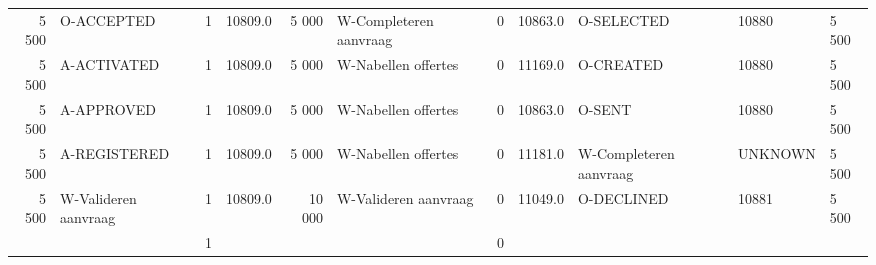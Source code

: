 \begin{tabular}{rlrlrlrllll}
5 500 & O-ACCEPTED & 1 & 10809.0 & 5 000 & W-Completeren aanvraag & 0 & 10863.0 & O-SELECTED & 10880 & 5 500 \\
5 500 & A-ACTIVATED & 1 & 10809.0 & 5 000 & W-Nabellen offertes & 0 & 11169.0 & O-CREATED & 10880 & 5 500 \\
5 500 & A-APPROVED & 1 & 10809.0 & 5 000 & W-Nabellen offertes & 0 & 10863.0 & O-SENT & 10880 & 5 500 \\
5 500 & A-REGISTERED & 1 & 10809.0 & 5 000 & W-Nabellen offertes & 0 & 11181.0 & W-Completeren aanvraag & UNKNOWN & 5 500 \\
5 500 & W-Valideren aanvraag & 1 & 10809.0 & 10 000 & W-Valideren aanvraag & 0 & 11049.0 & O-DECLINED & 10881 & 5 500 \\
 &  & 1 &  &  &  & 0 &  &  &  &  \\
\bottomrule
\end{tabular}

